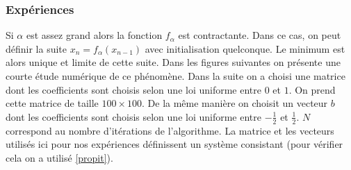 \documentclass[10pt,a4paper]{article}
\begin{document}
\subsubsection{Expériences}
Si $\alpha$ est assez grand alors la fonction $f_{\alpha}$ est contractante.
Dans ce cas, on peut définir la suite $x_n=f_{\alpha}(x_{n-1})$ avec initialisation quelconque.
Le minimum est alors unique et limite de cette suite.
Dans les figures suivantes on présente une courte étude numérique de ce phénomène.
Dans la suite on a choisi une matrice dont les coefficients sont choisis selon une loi uniforme entre $0$ et $1$.
On prend cette matrice de taille $100 \times 100$.
De la même manière on choisit un vecteur $b$ dont les coefficients sont choisis selon une loi uniforme entre $-\frac{1}{2}$ et $\frac{1}{2}$. $N$ correspond au nombre d'itérations de l'algorithme.
La matrice et les vecteurs utilisés ici pour nos expériences définissent un système consistant (pour vérifier cela on a utilisé \ref{propit}).
\end{document}
